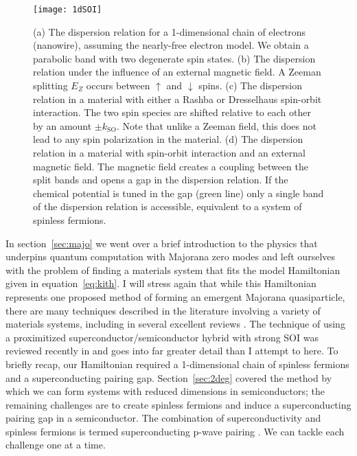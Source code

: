 \begin{figure}
  \texttt{[image: 1dSOI]}
  \caption[Spin-orbit interaction in a nanowire with a magnetic field]
  {\label{fig:1dsoi}(a) The dispersion relation for a 1-dimensional chain of electrons (nanowire), assuming the nearly-free electron model. We obtain a parabolic band with two degenerate spin states. (b) The dispersion relation under the influence of an external magnetic field. A Zeeman splitting $E_Z$ occurs between $\uparrow$ and $\downarrow$ spins. (c) The dispersion relation in a material with either a Rashba or Dresselhaus spin-orbit interaction. The two spin species are shifted relative to each other by an amount $\pm k_\textrm{SO}$. Note that unlike a Zeeman field, this does not lead to any spin polarization in the material. (d) The dispersion relation in a material with spin-orbit interaction and an external magnetic field. The magnetic field creates a coupling between the split bands and opens a gap in the dispersion relation. If the chemical potential is tuned in the gap (green line) only a single band of the dispersion relation is accessible, equivalent to a system of spinless fermions.}
\end{figure}

In section~\ref{sec:majo} we went over a brief introduction to the physics that underpins quantum computation with Majorana zero modes
and left ourselves with the problem of finding a materials system that fits the model Hamiltonian given in equation~\ref{eq:kith}. I will stress
again that while this Hamiltonian represents one proposed method of forming an emergent Majorana quasiparticle, there are many techniques described
in the literature involving a variety of materials systems, including in several excellent reviews \cite{RevModPhys.83.1057,doi:10.1146/030212-184337,Leijnse_2012,
RevModPhys.87.137,npjqi.2015.1,Aguado:2017ofc}. The technique of using a proximitized superconductor/semiconductor hybrid with strong SOI was reviewed
recently in \cite{s41578-018-0003-1} and goes into far greater detail than I attempt to here. To briefly recap, our Hamiltonian required a 1-dimensional
chain of spinless fermions and a superconducting pairing gap. Section~\ref{sec:2deg} covered the method by which we
can form systems with reduced dimensions in semiconductors; the remaining challenges are to create spinless fermions and induce a superconducting pairing gap
in a semiconductor. The combination of superconductivity and spinless fermions is termed superconducting p-wave pairing \cite{Kitaev_2001}. We can tackle
each challenge one at a time.

